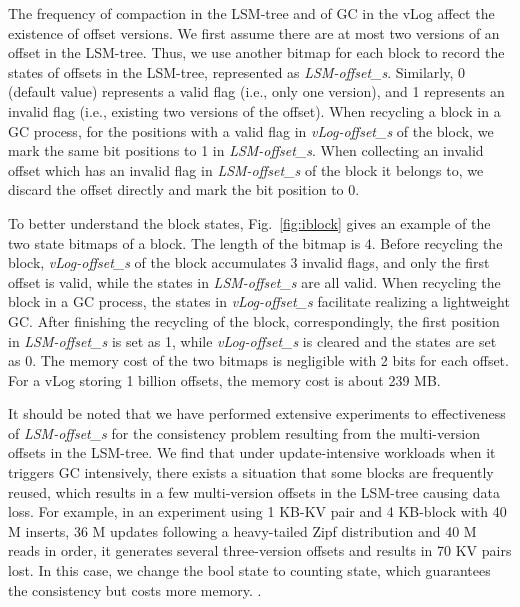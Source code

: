 \documentclass[sigconf]{acmart}
\begin{document}
The frequency of compaction in the LSM-tree and of GC in the vLog affect the existence of offset versions. We first assume there are at most two versions of an offset in the LSM-tree. Thus, we use another bitmap for each block to record the states of offsets in the LSM-tree, represented as \textit{LSM-offset\_s}. Similarly, 0 (default value) represents a valid flag (i.e., only one version), and 1 represents an invalid flag (i.e., existing two versions of the offset). When recycling a block in a GC process, for the positions with a valid flag in \textit{vLog-offset\_s} of the block, we mark the same bit positions to 1 in \textit{LSM-offset\_s}. When collecting an invalid offset which has an invalid flag in \textit{LSM-offset\_s} of the block it belongs to, we discard the offset directly and mark the bit position to 0.

To better understand the block states, Fig.~\ref{fig:iblock} gives an example of the two state bitmaps of a block. The length of the bitmap is 4. Before recycling the block, \textit{vLog-offset\_s} of the block accumulates 3 invalid flags, and only the first offset is valid, while the states in \textit{LSM-offset\_s} are all valid. When recycling the block in a GC process, the states in \textit{vLog-offset\_s} facilitate realizing a lightweight GC. After finishing the recycling of the block, correspondingly, the first position in \textit{LSM-offset\_s} is set as 1, while \textit{vLog-offset\_s} is cleared and the states are set as 0. The memory cost of the two bitmaps is negligible with 2 bits for each offset. For a vLog storing 1 billion offsets, the memory cost is about 239 MB.

It should be noted that we have performed extensive experiments to effectiveness of \textit{LSM-offset\_s} for the consistency problem resulting from the multi-version offsets in the LSM-tree. We find that under update-intensive workloads when it triggers GC intensively, there exists a situation that some blocks are frequently reused, which results in a few multi-version offsets in the LSM-tree causing data loss. For example, in an experiment using 1 KB-KV pair and 4 KB-block with 40 M inserts, 36 M updates following a heavy-tailed Zipf distribution and 40 M reads in order, it generates several three-version offsets and results in 70 KV pairs lost. In this case, we change the bool state to counting state, which guarantees the consistency but costs more memory. {}.
\end{document}
